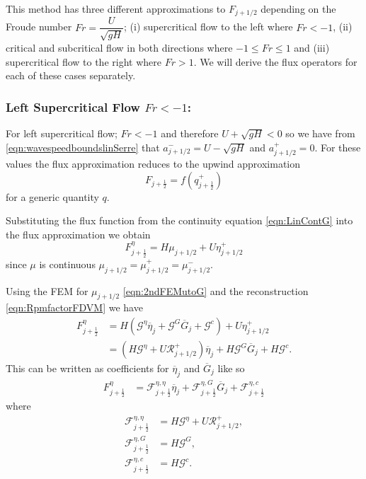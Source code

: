 This method has three different approximations to $F_{j+1/2}$ depending on the Froude number $Fr = \dfrac{U}{\sqrt{gH}}$; (i)
supercritical flow to the left where $Fr < -1$, (ii) critical and subcritical flow in both directions where $-1 \le Fr \le 1$ and (iii) supercritical flow to the right where $Fr > 1$. We will derive the flux operators for each of these cases separately.

\subsubsection{Left Supercritical Flow $Fr < -1$:}
For left supercritical flow; $Fr < -1$ and therefore $U + \sqrt{g H} < 0$ so we have from \eqref{eqn:wavespeedboundslinSerre} that $a^-_{j+ 1/2} = U - \sqrt{g H}$ and $a^+_{j+ 1/2} =  0$. For these values the flux approximation reduces to the upwind approximation 
\begin{equation}
F_{j+\frac{1}{2}} = f\left(q^+_{j+\frac{1}{2}}\right)
\label{eqn:fluxleftsupercrit}
\end{equation}
for a generic quantity $q$.

Substituting the flux function from the continuity equation \eqref{eqn:LinContG} into the flux approximation we obtain
\begin{equation*}
F^\eta_{j+\frac{1}{2}} = H \mu_{j+1/2} + U \eta^+_{j+1/2}
\end{equation*}
since $\mu$ is continuous $\mu_{j+1/2} = \mu_{j+1/2}^+ = \mu_{j+1/2}^- $. 

Using the FEM for $\mu_{j+1/2}$ \eqref{eqn:2ndFEMutoG} and the reconstruction \eqref{eqn:RpmfactorFDVM} we have
\begin{align*}
F^\eta_{j+\frac{1}{2}} &= H \left(\mathcal{G}^{\eta} \overline{\eta}_{j} + \mathcal{G}^G \overline{G}_{j} + \mathcal{G}^c\right) + U \eta^+_{j+1/2} \nonumber \\ &= \left(H \mathcal{G}^{\eta} + U \mathcal{R}^+_{j+1/2} \right)  \overline{\eta}_{j} + H \mathcal{G}^G \overline{G}_{j} + H\mathcal{G}^c .
\end{align*}
This can be written as coefficients for $\overline{\eta}_{j}$ and $\overline{G}_{j}$ like so
\begin{align*}
F^\eta_{j+\frac{1}{2}} &= \mathcal{F}^{\eta, \eta}_{j+\frac{1}{2}} \overline{\eta}_{j} + \mathcal{F}^{\eta, G}_{j+\frac{1}{2}} \overline{G}_{j} + \mathcal{F}^{\eta, c}_{j+\frac{1}{2}}
\end{align*}
where
\begin{align*}
\mathcal{F}^{\eta, \eta}_{j+\frac{1}{2}} &=  H \mathcal{G}^{\eta} + U \mathcal{R}^+_{j+1/2},\\
\mathcal{F}^{\eta, G}_{j+\frac{1}{2}} &=  H \mathcal{G}^G,\\
\mathcal{F}^{\eta, c}_{j+\frac{1}{2}} &=  H\mathcal{G}^c.
\end{align*}


